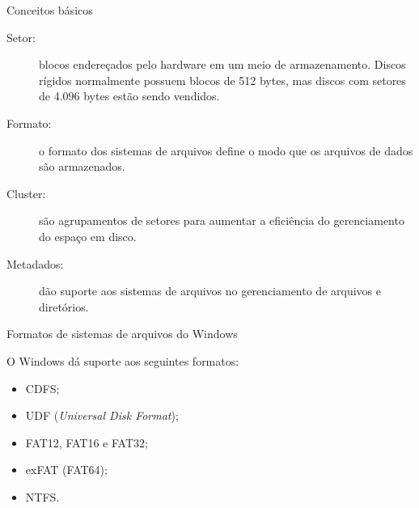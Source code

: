 \begin{frame}{Conceitos básicos}
  \begin{description}
  \item[Setor:] blocos endereçados pelo hardware em um meio de
    armazenamento. Discos rígidos normalmente possuem blocos de 512
    bytes, mas discos com setores de 4.096 bytes estão sendo vendidos.\pause
  \item[Formato:] o formato dos sistemas de arquivos define o modo que 
    os arquivos de dados são armazenados. \pause
  \item[Cluster:] são agrupamentos de setores para aumentar a eficiência 
    do gerenciamento do espaço em disco.\pause
  \item[Metadados:] dão suporte aos sistemas de arquivos no gerenciamento 
    de arquivos e diretórios.
  \end{description}
\end{frame}

\begin{frame}{Formatos de sistemas de arquivos do Windows}
  
  O Windows dá suporte aos seguintes formatos:

  \begin{itemize}
  \item CDFS;
  \item UDF ({\em Universal Disk Format});
  \item FAT12, FAT16 e FAT32;
  \item exFAT (FAT64);
  \item NTFS.
  \end{itemize}
\end{frame}

